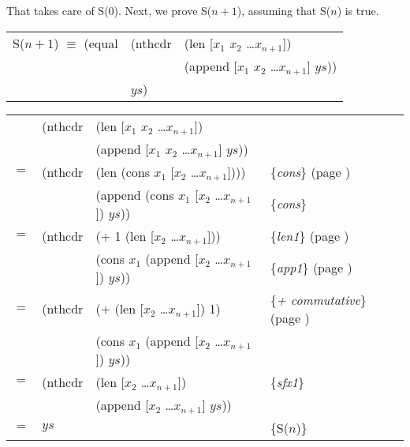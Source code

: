 That takes care of S(0). Next, we prove S($n+1$), assuming that S($n$) is true.

\begin{samepage}
\begin{center}
\begin{tabular}{lll}
S($n+1$) $\equiv$ (equal & (nthcdr & (len [$x_1$ $x_2$ \dots $x_{n+1}$])          \\
                         &         & (append [$x_1$ $x_2$ \dots $x_{n+1}$] $ys$)) \\
                         & $ys$)   &                                              \\
\end{tabular}
\end{center}
\end{samepage}

\begin{center}
\begin{tabular}{llll}
    & (nthcdr & (len [$x_1$ $x_2$ \dots $x_{n+1}$])          & \\
    &         & (append [$x_1$ $x_2$ \dots $x_{n+1}$] $ys$)) & \\
$=$ & (nthcdr & (len (cons $x_1$ [$x_2$ \dots $x_{n+1}$])))   & \{\emph{cons}\} (page \pageref{cons-axiom-informal}) \\
    &         & (append (cons $x_1$ [$x_2$ \dots $x_{n+1}$]) $ys$)) & \{\emph{cons}\}                                \\
$=$ & (nthcdr & (+ 1 (len [$x_2$ \dots $x_{n+1}$]))                 & \{\emph{len1}\} (page \pageref{len-equations})       \\
    &         & (cons $x_1$ (append [$x_2$ \dots $x_{n+1}$]) $ys$)) & \{\emph{app1}\} (page \pageref{append-equations})    \\
$=$ & (nthcdr & (+ (len [$x_2$ \dots $x_{n+1}$]) 1)                 & \{\emph{+ commutative}\} (page \pageref{fig-02-01})  \\
    &         & (cons $x_1$ (append [$x_2$ \dots $x_{n+1}$]) $ys$)) &                                                      \\
$=$ & (nthcdr & (len [$x_2$ \dots $x_{n+1}$])                       & \{\emph{sfx1}\}                                      \\
    &         & (append [$x_2$ \dots $x_{n+1}$] $ys$))              &                                                      \\
$=$ & $ys$    &                                                     & \{S($n$)\}                                           \\
\end{tabular}
\end{center}


